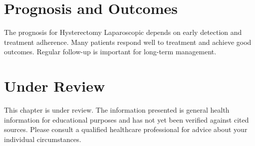 \section*{Prognosis and Outcomes}
The prognosis for Hysterectomy Laparoscopic depends on early detection and treatment adherence. Many patients respond well to treatment and achieve good outcomes. Regular follow-up is important for long-term management.
\section*{Under Review}
This chapter is under review. The information presented is general health information for educational purposes and has not yet been verified against cited sources. Please consult a qualified healthcare professional for advice about your individual circumstances.


\clearpage
